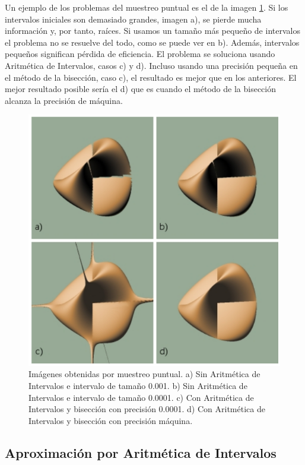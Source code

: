 Un ejemplo de los problemas del muestreo puntual es el de la imagen \ref{florez45}. Si los intervalos iniciales son demasiado grandes, imagen a), se pierde mucha información y, por tanto, raíces. Si usamos un tamaño más pequeño de intervalos el problema no se resuelve del todo, como se puede ver en b). Además, intervalos pequeños significan pérdida de eficiencia. El problema se soluciona usando Aritmética de Intervalos, casos c) y d). Incluso usando una precisión pequeña en el método de la bisección, caso c), el resultado es mejor que en los anteriores. El mejor resultado posible sería el d) que es cuando el método de la bisección alcanza la precisión de máquina.
\begin{figure}[h]
	\centering
	\includegraphics[scale=0.5]{images/florez5.png}
	\caption{Imágenes obtenidas por muestreo puntual. a) Sin Aritmética de Intervalos e intervalo de tamaño 0.001. b) Sin Aritmética de Intervalos e intervalo de tamaño 0.0001. c) Con Aritmética de Intervalos y bisección con precisión 0.0001. d) Con Aritmética de Intervalos y bisección con precisión máquina.}
	\label{florez45}
\end{figure}

\subsection{Aproximación por Aritmética de Intervalos}

